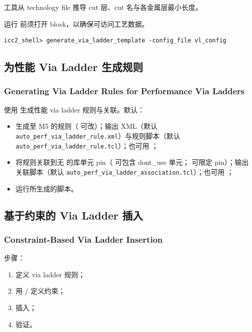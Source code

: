工具从 technology file 推导 cut 层、cut 名与各金属层最小长度。

\begin{noteBox}
运行  前须打开 block，以确保可访问工艺数据。
\end{noteBox}

\begin{lstlisting}
icc2_shell> generate_via_ladder_template -config_file vl_config
\end{lstlisting}

\subsection{为性能 Via Ladder 生成规则}
\subsubsection*{Generating Via Ladder Rules for Performance Via Ladders}

使用  生成性能 via ladder 规则与关联。默认：
\begin{itemize}
  \item 生成至 M5 的规则（ 可改）；输出 XML（默认 \texttt{auto\_perf\_via\_ladder\_rule.xml}）与规则脚本（默认 \texttt{auto\_perf\_via\_ladder\_rule.tcl}）；也可用 ；
  \item 将规则关联到无  的库单元 pin（ 可包含 dont\_use 单元； 可限定 pin）；输出关联脚本（默认 \texttt{auto\_perf\_via\_ladder\_association.tcl}）；也可用 ；
  \item 运行所生成的脚本。
\end{itemize}

\subsection{基于约束的 Via Ladder 插入}
\subsubsection*{Constraint-Based Via Ladder Insertion}

步骤：
\begin{enumerate}
  \item 定义 via ladder 规则；
  \item 用  /  定义约束；
  \item {} 插入；
  \item {} 验证。
\end{enumerate}

